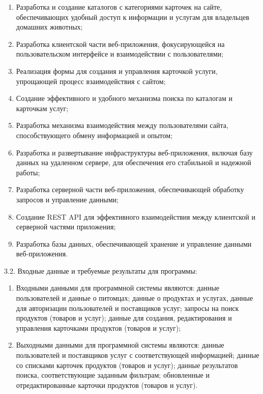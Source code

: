 \begin{enumerate}
\item Разработка и создание каталогов с категориями карточек на сайте, обеспечивающих удобный доступ к информации и услугам для владельцев домашних животных;
\item Разработка клиентской части веб-приложения, фокусирующейся на пользовательском интерфейсе и взаимодействии с пользователями;
\item Реализация формы для создания и управления карточкой услуги, упрощающей процесс взаимодействия с сайтом;
\item Создание эффективного и удобного механизма поиска по каталогам и карточкам услуг;
\item Разработка механизма взаимодействия между пользователями сайта, способствующего обмену информацией и опытом;
\item Разработка и развертывание инфраструктуры веб-приложения, включая базу данных на удаленном сервере, для обеспечения его стабильной и надежной работы;
\item Разработка серверной части веб-приложения, обеспечивающей обработку запросов и управление данными;
\item Создание REST API для эффективного взаимодействия между клиентской и серверной частями приложения;
\item Разработка базы данных, обеспечивающей хранение и управление данными веб-приложения.
\end{enumerate}

{\parindent0pt
  3.2. Входные данные и требуемые результаты для программы:}

\begin{enumerate}
\item Входными данными для программной системы являются: данные пользователей и данные о питомцах;
данные о продуктах и услугах, данные для авторизации пользователей и поставщиков услуг;
запросы на поиск продуктов (товаров и услуг);
данные для создания, редактирования и управления карточками продуктов (товаров и услуг);
\item Выходными данными для программной системы являются: данные пользователей и поставщиков услуг с соответствующей информацией;
данные со списками карточек продуктов (товаров и услуг);
данные результатов поиска, соответствующие заданным фильтрам;
обновленные и отредактированные карточки продуктов (товаров и услуг).
\end{enumerate}

